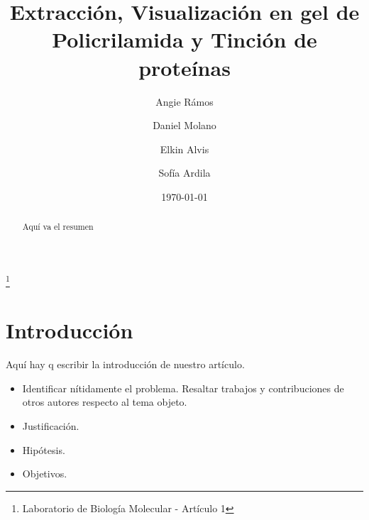 \documentclass[%
 reprint,
 amsmath,amssymb,
 aps,
showkeys
]{revtex4-1}
\begin{document}

\title{Extracción, Visualización en gel de Policrilamida y Tinción de proteínas}%
\thanks{Laboratorio de Biología Molecular - Artículo 1}%

\author{Angie Rámos}
\author{Daniel Molano}%
\author{Elkin Alvis}
\author{Sof\'ia Ardila}

%


\date[Fecha: ]{\today}%

\begin{abstract}
Aquí va el resumen
\end{abstract}

\maketitle


\section{\label{sec:Intro}Introducción}
	Aquí hay q escribir la introducción de nuestro artículo\citep{Alfonso2010a}. \\
	
	\begin{itemize}
		\item Identificar nítidamente el problema.
		\subitem Resaltar trabajos y contribuciones de otros autores respecto al tema objeto.
		\item Justificación.
		\item Hipótesis. 
		\item Objetivos.
	\end{itemize}
	
\end{document}
